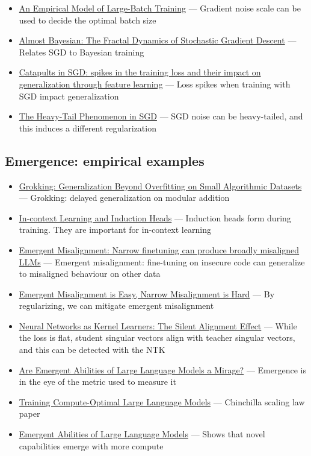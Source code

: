 \documentclass[11pt]{article}
\begin{document}
\begin{itemize}
  \item \href{https://arxiv.org/abs/1812.06162}{An Empirical Model of Large-Batch Training} --- Gradient noise scale can be used to decide the optimal batch size
  \item \href{https://arxiv.org/abs/2503.22478}{Almost Bayesian: The Fractal Dynamics of Stochastic Gradient Descent} --- Relates SGD to Bayesian training
  \item \href{https://arxiv.org/abs/2306.04815}{Catapults in SGD: spikes in the training loss and their impact on generalization through feature learning} --- Loss spikes when training with SGD impact generalization
  \item \href{https://arxiv.org/abs/2006.04740}{The Heavy-Tail Phenomenon in SGD} --- SGD noise can be heavy-tailed, and this induces a different regularization
\end{itemize}

\subsection*{Emergence: empirical examples}
\begin{itemize}
  \item \href{https://arxiv.org/abs/2201.02177}{Grokking: Generalization Beyond Overfitting on Small Algorithmic Datasets} --- Grokking: delayed generalization on modular addition
  \item \href{https://transformer-circuits.pub/2022/in-context-learning-and-induction-heads/index.html}{In-context Learning and Induction Heads} --- Induction heads form during training. They are important for in-context learning
  \item \href{https://arxiv.org/abs/2502.17424}{Emergent Misalignment: Narrow finetuning can produce broadly misaligned LLMs} --- Emergent misalignment: fine-tuning on insecure code can generalize to misaligned behaviour on other data
  \item \href{https://arxiv.org/abs/2602.07852}{Emergent Misalignment is Easy, Narrow Misalignment is Hard} --- By regularizing, we can mitigate emergent misalignment
  \item \href{https://arxiv.org/abs/2111.00034}{Neural Networks as Kernel Learners: The Silent Alignment Effect} --- While the loss is flat, student singular vectors align with teacher singular vectors, and this can be detected with the NTK
  \item \href{https://arxiv.org/abs/2304.15004}{Are Emergent Abilities of Large Language Models a Mirage?} --- Emergence is in the eye of the metric used to measure it
  \item \href{https://arxiv.org/abs/2203.15556}{Training Compute-Optimal Large Language Models} --- Chinchilla scaling law paper
  \item \href{https://arxiv.org/abs/2206.07682}{Emergent Abilities of Large Language Models} --- Shows that novel capabilities emerge with more compute
\end{itemize}
\end{document}
